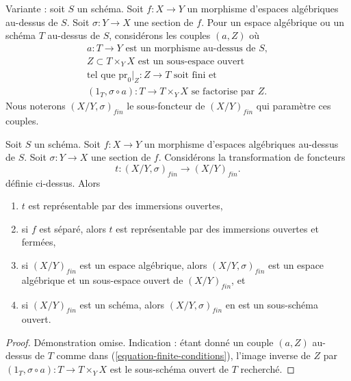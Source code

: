 \noindent
Variante : soit $S$ un schéma.
Soit $f : X \to Y$ un morphisme d'espaces algébriques au-dessus de $S$.
Soit $\sigma : Y \to X$ une section de $f$.
Pour un espace algébrique ou un schéma $T$ au-dessus de $S$, considérons les couples
$(a, Z)$ où
\begin{equation}
\label{equation-finite-conditions-variant}
\begin{matrix}
a : T \to Y\text{ est un morphisme au-dessus de }S, \\
Z \subset T \times_Y X\text{ est un sous-espace ouvert} \\
\text{tel que }\text{pr}_0|_Z : Z \to T\text{ soit fini et} \\
(1_T, \sigma \circ a) : T \to T \times_Y X\text{ se factorise par }Z.
\end{matrix}
\end{equation}
Nous noterons $(X/Y, \sigma)_{fin}$ le sous-foncteur de $(X/Y)_{fin}$
qui paramètre ces couples.

\begin{lemma}
\label{lemma-finite-plus-section}
Soit $S$ un schéma.
Soit $f : X \to Y$ un morphisme d'espaces algébriques au-dessus de $S$.
Soit $\sigma : Y \to X$ une section de $f$. Considérons la
transformation de foncteurs
$$
t : (X/Y, \sigma)_{fin} \longrightarrow (X/Y)_{fin}.
$$
définie ci-dessus. Alors
\begin{enumerate}
\item $t$ est représentable par des immersions ouvertes,
\item si $f$ est séparé, alors $t$ est représentable par des immersions
ouvertes et fermées,
\item si $(X/Y)_{fin}$ est un espace algébrique, alors
$(X/Y, \sigma)_{fin}$ est un espace algébrique et
un sous-espace ouvert de $(X/Y)_{fin}$, et
\item si $(X/Y)_{fin}$ est un schéma, alors $(X/Y, \sigma)_{fin}$ en est un
sous-schéma ouvert.
\end{enumerate}
\end{lemma}

\begin{proof}
Démonstration omise. Indication : étant donné un couple $(a, Z)$ au-dessus de $T$ comme dans
(\ref{equation-finite-conditions}), l'image inverse de
$Z$ par $(1_T, \sigma \circ a) : T \to T \times_Y X$ est le sous-schéma ouvert
de $T$ recherché.
\end{proof}





